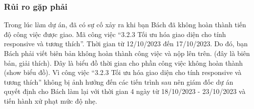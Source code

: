 \documentclass[12pt]{article}
\begin{document}
\subsubsection{Rủi ro gặp phải}
\hspace{1cm}Trong lúc làm dự án, đã có sự cố xảy ra khi bạn Bách đã không hoàn thành tiến độ công việc được giao. Mã công việc “3.2.3 Tối ưu hóa giao diện cho tính responsive và tương thích”. Thời gian từ 12/10/2023 đến 17/10/2023. Do đó, bạn Bách phải viết biên bản không hoàn thành công việc và nộp lên trên. (đây là biên bản, giải thích). Đây là biểu đồ thời gian cho phần công việc không hoàn thành (show biểu đồ). Vì công việc “3.2.3 Tối ưu hóa giao diện cho tính responsive và tương thích” không bị ảnh hưởng đến các tiến trình sau nên giám đốc dự án quyết định cho Bách làm lại với thời gian 4 ngày từ 18/10/2023 - 23/10/2023 và tiến hành xử phạt mức độ nhẹ.
\begin{center}
\begin{adjustbox}{max width=16cm}
\hspace{-2cm}
\end{adjustbox}
\end{center}
\end{document}
